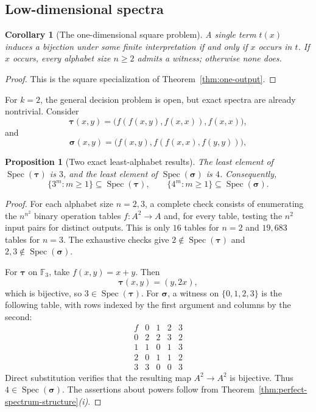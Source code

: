 \documentclass[11pt]{article}
\theoremstyle{definition}
\theoremstyle{plain}
\newtheorem{proposition}[definition]{Proposition}
\newtheorem{corollary}[definition]{Corollary}
\newcommand{\PerfSpec}{\operatorname{Spec}}
\begin{document}
\subsection{Low-dimensional spectra}

\begin{corollary}[The one-dimensional square problem]
\label{cor:bij-one}
A single term $t(x)$ induces a bijection under some finite interpretation if and only if $x$ occurs in $t$.
If $x$ occurs, every alphabet size $n\ge2$ admits a witness; otherwise none does.
\end{corollary}

\begin{proof}
This is the square specialization of Theorem~\ref{thm:one-output}.
\end{proof}

For $k=2$, the general decision problem is open, but exact spectra are already nontrivial.  Consider
\[
\boldsymbol\tau(x,y)=\bigl(f(f(x,y),f(x,x)),f(x,x)\bigr),
\]
and
\[
\boldsymbol\sigma(x,y)=\bigl(f(x,y),f(f(x,x),f(y,y))\bigr),
\]

\begin{proposition}[Two exact least-alphabet results]
\label{prop:small-spectra}
The least element of $\PerfSpec(\boldsymbol\tau)$ is $3$, and the least element of
$\PerfSpec(\boldsymbol\sigma)$ is $4$.  Consequently,
\[
\{3^m:m\ge1\}\subseteq\PerfSpec(\boldsymbol\tau),
\qquad
\{4^m:m\ge1\}\subseteq\PerfSpec(\boldsymbol\sigma).
\]
\end{proposition}

\begin{proof}
For each alphabet size $n=2,3$, a complete check consists of enumerating the $n^{n^2}$ binary operation tables
$f:A^2\to A$ and, for every table, testing the $n^2$ input pairs for distinct outputs.  This is only $16$
tables for $n=2$ and $19{,}683$ tables for $n=3$.  The exhaustive checks give
$2\notin\PerfSpec(\boldsymbol\tau)$ and
$2,3\notin\PerfSpec(\boldsymbol\sigma)$.

For $\boldsymbol\tau$ on $\mathbb F_3$, take $f(x,y)=x+y$.  Then
\[
\boldsymbol\tau(x,y)=(y,2x),
\]
which is bijective, so $3\in\PerfSpec(\boldsymbol\tau)$.  For $\boldsymbol\sigma$, a witness on
$\{0,1,2,3\}$ is the following table, with rows indexed by the first argument and columns by the second:
\[
\begin{array}{c|cccc}
f & 0&1&2&3\\ \hline
0 & 2&2&3&2\\
1 & 1&0&1&3\\
2 & 0&1&1&2\\
3 & 3&0&0&3
\end{array}
\]
Direct substitution verifies that the resulting map $A^2\to A^2$ is bijective.  Thus
$4\in\PerfSpec(\boldsymbol\sigma)$.  The assertions about powers follow from
Theorem~\ref{thm:perfect-spectrum-structure}\textit{(i)}.
\end{proof}
\end{document}
